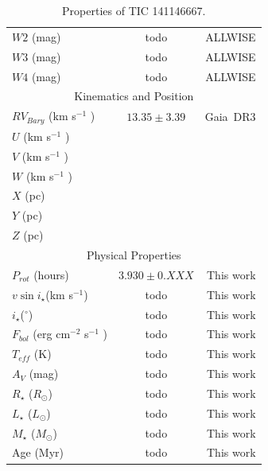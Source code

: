 \documentclass{nature3}
\newcommand{\starname}{TIC 141146667}
\begin{document}
\begin{methods}
\begin{table}
\begin{tabular}{lcr}
    $W2$ (mag) & todo & ALLWISE \\
    $W3$ (mag) & todo & ALLWISE \\
    $W4$ (mag) & todo & ALLWISE \\
    \hline
    \multicolumn{3}{c}{Kinematics and Position} \\
    \hline
    $RV_{Bary}$ (km s$^{-1}$ ) & $13.35 \pm 3.39$ & Gaia\ DR3 \\
    $U$ (km s$^{-1}$ ) & & \\
    $V$ (km s$^{-1}$ ) & & \\
    $W$ (km s$^{-1}$ ) & & \\
    $X$ (pc)  & & \\
    $Y$ (pc)  & & \\
    $Z$ (pc) & & \\
    \hline
    \multicolumn{3}{c}{Physical Properties} \\
    \hline
    $P_{rot}$ (hours) & $3.930 \pm 0.XXX$ & This work \\ 
    $v \sin i_\star$(km s$^{-1}$) & todo & This work\\
    $i_\star$($^\circ$) & todo & This work \\
    $F_{bol}$ (erg cm$^{-2}$ s$^{-1}$ ) & todo & This work\\
    $T_{eff}$ (K) & todo & This work\\
    $A_V$ (mag) & todo & This work \\
    $R_\star$ ($R_{\odot}$) & todo & This work\\
    $L_\star$ ($L_{\odot}$)  & todo & This work\\
    $M_\star$ ($M_{\odot}$)  & todo & This work\\
    Age (Myr) & todo &  This work \\
    \hline
    \end{tabular}
    \caption{Properties of \starname.}
    \label{tab:stellarParameters}
\end{table}


\end{methods}

   
\end{document}
